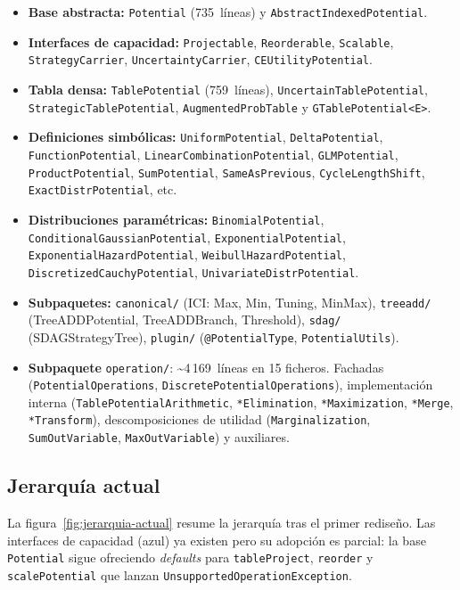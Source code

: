 \documentclass[11pt,a4paper]{article}
\newcommand{\code}[1]{\texttt{#1}}
\begin{document}
\begin{itemize}[leftmargin=*]
  \item \textbf{Base abstracta:} \code{Potential} (735~líneas) y
        \code{AbstractIndexedPotential}.
  \item \textbf{Interfaces de capacidad:} \code{Projectable},
        \code{Reorderable}, \code{Scalable}, \code{StrategyCarrier},
        \code{UncertaintyCarrier}, \code{CEUtilityPotential}.
  \item \textbf{Tabla densa:} \code{TablePotential} (759~líneas),
        \code{Uncertain\-Table\-Potential}, \code{StrategicTablePotential},
        \code{AugmentedProbTable} y \code{GTable\-Potential<E>}.
  \item \textbf{Definiciones simbólicas:} \code{UniformPotential},
        \code{DeltaPotential}, \code{FunctionPotential},
        \code{LinearCombinationPotential}, \code{GLMPotential},
        \code{ProductPotential}, \code{SumPotential}, \code{SameAsPrevious},
        \code{CycleLengthShift}, \code{ExactDistrPotential}, etc.
  \item \textbf{Distribuciones paramétricas:} \code{BinomialPotential},
        \code{ConditionalGaussianPotential},
        \code{ExponentialPotential},
        \code{ExponentialHazardPotential},
        \code{WeibullHazardPotential},
        \code{DiscretizedCauchyPotential},
        \code{Univariate\-Distr\-Potential}.
  \item \textbf{Subpaquetes:} \code{canonical/} (ICI: Max, Min, Tuning,
        MinMax), \code{treeadd/} (TreeADD\-Potential, TreeADDBranch,
        Threshold), \code{sdag/} (SDAGStrategyTree), \code{plugin/}
        (\code{@PotentialType}, \code{PotentialUtils}).
  \item \textbf{Subpaquete} \code{operation/}: \textasciitilde 4\,169~líneas
        en 15 ficheros. Fachadas (\code{PotentialOperations},
        \code{DiscretePotentialOperations}), implementación interna
        (\code{TablePotentialArithmetic}, \code{*Elimination},
        \code{*Maximization}, \code{*Merge}, \code{*Transform}), descomposiciones
        de utilidad (\code{Marginalization}, \code{SumOutVariable},
        \code{MaxOutVariable}) y auxiliares.
\end{itemize}

\subsection{Jerarquía actual}

La figura~\ref{fig:jerarquia-actual} resume la jerarquía tras el primer
rediseño. Las interfaces de capacidad (azul) ya existen pero su adopción es
parcial: la base \code{Potential} sigue ofreciendo \emph{defaults} para
\code{tableProject}, \code{reorder} y \code{scalePotential} que lanzan
\code{UnsupportedOperationException}.
\end{document}

